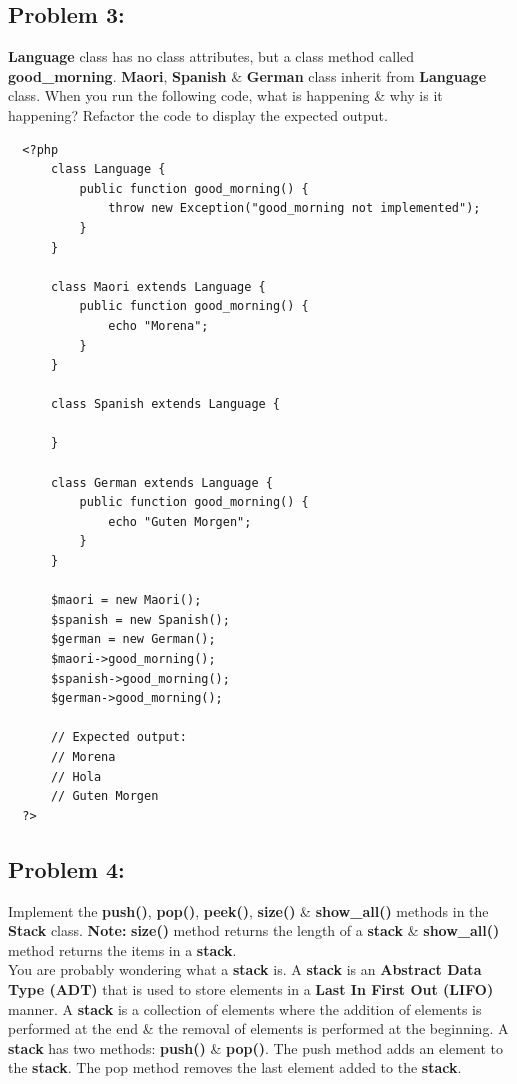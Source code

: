 \documentclass{article}
\begin{document}
\subsection*{Problem 3:} 
\textbf{Language} class has no class attributes, but a class method called \textbf{good\_morning}. \textbf{Maori}, \textbf{Spanish} \& \textbf{German} class inherit from \textbf{Language} class. When you run the following code, what is happening \& why is it happening? Refactor the code to display the expected output.

\begin{verbatim}
  <?php
      class Language {
          public function good_morning() {
              throw new Exception("good_morning not implemented");
          }
      }    

      class Maori extends Language {
          public function good_morning() {
              echo "Morena";
          }
      }

      class Spanish extends Language {

      }

      class German extends Language {
          public function good_morning() {
              echo "Guten Morgen";
          }
      }
          
      $maori = new Maori();
      $spanish = new Spanish();
      $german = new German();
      $maori->good_morning();
      $spanish->good_morning();
      $german->good_morning();

      // Expected output:
      // Morena
      // Hola
      // Guten Morgen
  ?>
\end{verbatim} 

\subsection*{Problem 4:} 
Implement the \textbf{push()}, \textbf{pop()}, \textbf{peek()}, \textbf{size()} \& \textbf{show\_all()} methods in the \textbf{Stack} class. \textbf{Note:} \textbf{size()} method returns the length of a \textbf{stack} \& \textbf{show\_all()} method returns the items in a \textbf{stack}. \\

You are probably wondering what a \textbf{stack} is. A \textbf{stack} is an \textbf{Abstract Data Type (ADT)} that is used to store elements in a \textbf{Last In First Out (LIFO)} manner. A \textbf{stack} is a collection of elements where the addition of elements is performed at the end \& the removal of elements is performed at the beginning. A \textbf{stack} has two methods: \textbf{push()} \& \textbf{pop()}. The push method adds an element to the \textbf{stack}. The pop method removes the last element added to the \textbf{stack}. \\
\end{document}
